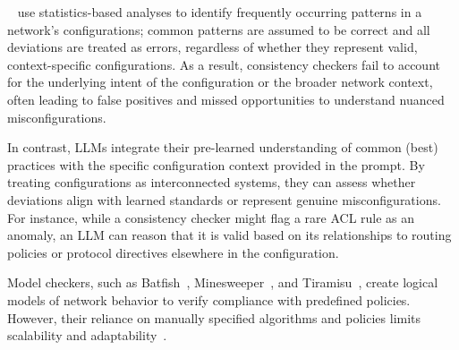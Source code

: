 ~\cite{kakarla2024diffy,kakarla2020finding, le2006minerals, feamster2005detecting, tang2021campion, le2008detecting, le2006characterization, batfish}
use statistics-based analyses to identify frequently occurring patterns in a network's  configurations;
common patterns are assumed to be correct and all deviations are treated as errors, regardless of whether they represent valid, context-specific configurations. As a result, consistency checkers fail to account for the underlying intent of the configuration or the broader network context, often leading to false positives and missed opportunities to understand nuanced misconfigurations.

In contrast, LLMs integrate their pre-learned understanding of common (best) practices with the specific configuration context provided in the prompt. By treating configurations as interconnected systems, they can assess whether deviations align with learned standards or represent genuine misconfigurations. For instance, while a consistency checker might flag a rare ACL rule as an anomaly, an LLM can reason that it is valid based on its relationships to routing policies or protocol directives elsewhere in the configuration.


Model checkers, such as Batfish~\cite{fogel2015general, batfish}, Minesweeper~\cite{beckett2017general}, and Tiramisu~\cite{abhashkumar2020tiramisu}, create logical models of network behavior to verify compliance with predefined policies. However, their reliance on manually specified algorithms and policies limits scalability  and adaptability~\cite{ye2020hoyan, birkner2021metha}.


